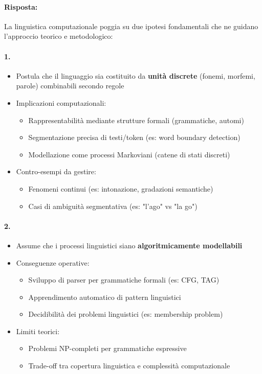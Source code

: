 
\paragraph{Risposta:} La linguistica computazionale poggia su due ipotesi fondamentali che ne guidano l'approccio teorico e metodologico:

\paragraph{1. }
\begin{itemize}
  \item Postula che il linguaggio sia costituito da \textbf{unità discrete} (fonemi, morfemi, parole) combinabili secondo regole
  \item Implicazioni computazionali:
  \begin{itemize}
    \item Rappresentabilità mediante strutture formali (grammatiche, automi)
    \item Segmentazione precisa di testi/token (es: word boundary detection)
    \item Modellazione come processi Markoviani (catene di stati discreti)
  \end{itemize}
  \item Contro-esempi da gestire:
  \begin{itemize}
    \item Fenomeni continui (es: intonazione, gradazioni semantiche)
    \item Casi di ambiguità segmentativa (es: "l'ago" vs "la go")
  \end{itemize}
\end{itemize}

\paragraph{2. }
\begin{itemize}
  \item Assume che i processi linguistici siano \textbf{algoritmicamente modellabili}
  \item Conseguenze operative:
  \begin{itemize}
    \item Sviluppo di parser per grammatiche formali (es: CFG, TAG)
    \item Apprendimento automatico di pattern linguistici
    \item Decidibilità dei problemi linguistici (es: membership problem)
  \end{itemize}
  \item Limiti teorici:
  \begin{itemize}
    \item Problemi NP-completi per grammatiche espressive
    \item Trade-off tra copertura linguistica e complessità computazionale
  \end{itemize}
\end{itemize}

